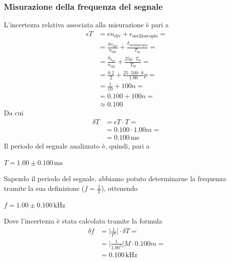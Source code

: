 \documentclass[a4paper]{article}
\begin{document}
			\subsubsection{Misurazione della frequenza del segnale}
				L'incertezza relativa associata alla misurazione è pari a 
				\begin{equation*}
					\begin{split}
						\epsilon T &= \epsilon n_{\mathrm{div}} + \epsilon_{\mathrm{oscilloscopio}} = \\
								   &= \frac{\delta n_{\mathrm{div}}}{n_{\mathrm{div}}} + \frac{\delta_{\mathrm{oscilloscopio}}}{T_{\mathrm{m}}} = \\
								   &= \frac{\delta_{\mathrm{n_{\mathrm{div}}}}}{n_{\mathrm{div}}} + \frac{25\mu \cdot T_{\mathrm{fs}}}{T_{\mathrm{m}}} = \\
								   &= \frac{0.2}{2} + \frac{25 \cdot 500 \cdot 8}{1.00}p = \\
								   &= \frac{1}{10} + 100n = \\
								   &= 0.100 + 100n = \\
								   &\approx 0.100
					\end{split}
				\end{equation*}
				Da cui
				\begin{equation*}
					\begin{split}
						\delta T &= \epsilon T \cdot T = \\
								 &= 0.100 \cdot 1.00m = \\
								 &= 0.100 \, \mathrm{ms}
					\end{split}
				\end{equation*}
				Il periodo del segnale analizzato è, quindi, pari a
				\newline
				\begin{center}
					$ T = 1.00 \pm 0.100 \, \mathrm{ms} $
				\end{center}
				\newline
				Sapendo il periodo del segnale, abbiamo potuto determinarne la frequenza tramite la sua definizione ($ f = \mathrm{\frac{1}{T}} $), ottenendo
				\newline
				\begin{center}
					$ f = 1.00 \pm 0.100 \, \mathrm{kHz} $
				\end{center}
				\newline
				Dove l'incertezza è stata calcolata tramite la formula
				\begin{equation*}
					\begin{split}
						\delta f &= \lvert \frac{1}{T^{2}} \rvert \cdot \delta T = \\
								 &= \lvert \frac{1}{1.00^{2}} \rvert M \cdot 0.100m = \\
								 &= 0.100 \, \mathrm{kHz}
					\end{split}
				\end{equation*}
\end{document}

